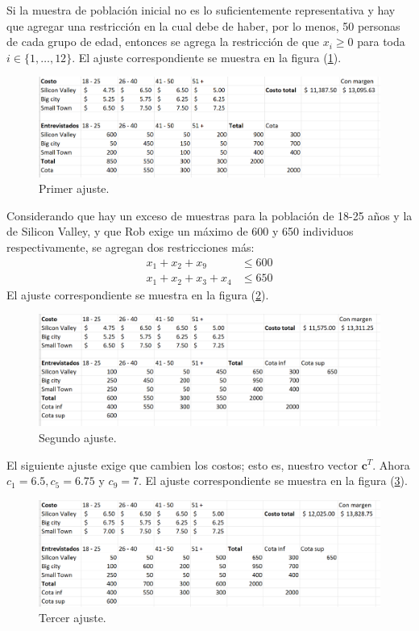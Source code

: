 \documentclass[12pt]{article}
\begin{document}
Si la muestra de población inicial no es lo suficientemente representativa y hay que agregar una restricción en la cual debe de haber, por lo menos, 50 personas de cada grupo de edad, entonces se agrega la restricción de que $x_i \geq 0$ para toda $i \in \{1,\ldots,12\}$. El ajuste correspondiente se muestra en la figura (\ref{fig:img2}).
\begin{figure}
    \centering
    \includegraphics[scale=0.4]{imgs/ajuste1.png}
    \caption{Primer ajuste.}    
    \label{fig:img2}   
\end{figure}

Considerando que hay un exceso de muestras para la población de 18-25 años y la de Silicon Valley, y que Rob exige un máximo de 600 y 650 individuos respectivamente, se agregan dos restricciones más:
\begin{align*}
    x_1 + x_2 + x_9 &\leq 600 \\
    x_1 + x_2 + x_3 + x_4 &\leq 650
\end{align*}
El ajuste correspondiente se muestra en la figura (\ref{fig:img3}).
\begin{figure}
    \centering
    \includegraphics[scale=0.4]{imgs/ajuste2.png}
    \caption{Segundo ajuste.}    
    \label{fig:img3}   
\end{figure}

El siguiente ajuste exige que cambien los costos; esto es, nuestro vector $\pmb{c}^T$. Ahora $c_1 = 6.5, c_5 = 6.75$ y $c_9 = 7$. El ajuste correspondiente se muestra en la figura (\ref{fig:img4}).
\begin{figure}
    \centering
    \includegraphics[scale=0.4]{imgs/ajuste3.png}
    \caption{Tercer ajuste.}    
    \label{fig:img4}   
\end{figure}
\end{document}
